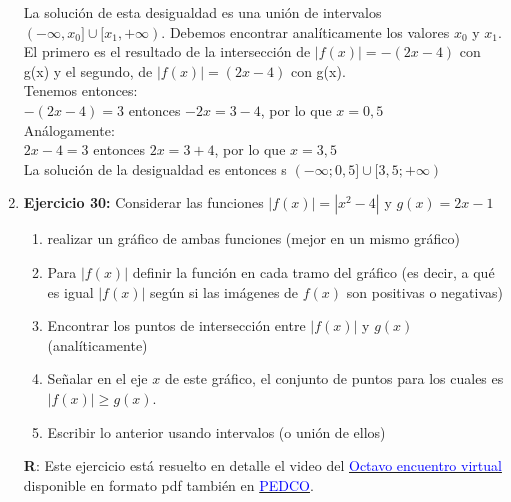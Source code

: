 \documentclass[12pt]{article}
\theoremstyle{definition}
\begin{document}
\begin{enumerate}
La solución de esta desigualdad es una unión de intervalos $(-\infty, x_0] \cup [x_1, + \infty)$. Debemos encontrar analíticamente los valores $x_0$ y $x_1$. El primero es el resultado de la intersección de $|f(x)| = -(2x-4)$ con g(x) y el segundo, de  $|f(x)| = (2x-4)$ con g(x).\\
Tenemos entonces:\\
$-(2x-4)= 3$ entonces $-2x = 3-4$, por lo que $x = 0,5$\\
Análogamente:\\
$2x-4= 3$ entonces $2x = 3+4$, por lo que $x =3,5$\\
La solución de la desigualdad es entonces s $(-\infty; 0,5] \cup [3,5 ; + \infty)$


\item   \textbf{Ejercicio 30:} Considerar las funciones  $|f(x)| = |x^{2}-4|$ y $g(x) = 2x-1$
\begin{enumerate}
\item realizar un gráfico de ambas funciones (mejor en un mismo gráfico)
\item Para $|f(x)|$ definir la función en cada tramo del gráfico (es decir, a qué es igual $|f(x)|$ según si las imágenes de $f(x)$ son positivas o negativas)
\item Encontrar los puntos de intersección entre $|f(x)|$ y $g(x)$ (analíticamente)
\item Señalar en el eje $x$ de este gráfico, el conjunto de puntos para los cuales es $|f(x)| \geq g(x)$.
\item Escribir lo anterior usando intervalos (o unión de ellos)
\end{enumerate}
\textbf{R}: Este ejercicio está resuelto en detalle el video del \href{https://youtu.be/myuKj55l_jg }{\textcolor{blue}{Octavo encuentro virtual}} disponible en formato pdf también en \href{https://pedco.uncoma.edu.ar/}{\textcolor{blue}{ PEDCO}}.



\end{enumerate}
\end{document}
